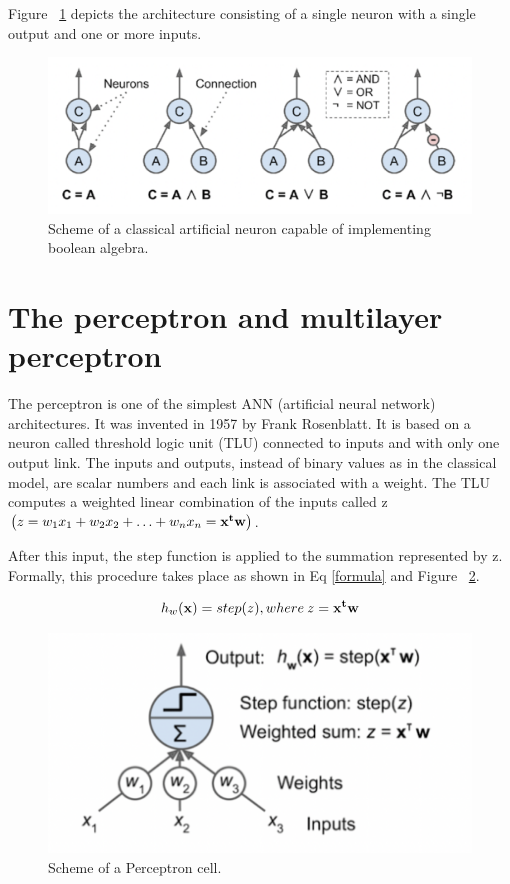 Figure ~\ref{fig:neuronsBasic} depicts the architecture consisting of a single neuron with a single output and one or more inputs.
\begin{figure} [h]
    \centering
    \includegraphics [width=\textwidth,height=\textheight,keepaspectratio] {Assets/Theory_and_methods/unnamed.png}
    \caption{ Scheme of a classical artificial neuron capable of implementing boolean algebra.}
    \label{fig:neuronsBasic}
\end{figure}

\clearpage

\section{The perceptron and multilayer perceptron} \label{percy}
The perceptron is one of the simplest ANN (artificial neural network) architectures. It was invented in 1957 by Frank Rosenblatt. It is based on a neuron called threshold logic unit (TLU) connected to inputs and with only one output link. The inputs and outputs, instead of binary values as in the classical model, are scalar numbers and each link is associated with a weight. The TLU computes a weighted linear combination of the inputs called z $\left(z=w_{1} x_{1}+w_{2} x_{2}+\ldots+w_{n} x_{n}= {\bf x^{t} w}\right)$.

After this input, the step function is applied to the summation represented by z. Formally, this procedure takes place as shown in Eq \eqref{formula} and Figure ~\ref{fig:summatory}.

\begin{equation} 
    h_{w}({\bf x}) = step(z), where \:z = {\bf x^{t} w}
    \label{formula}
\end{equation} 

\begin{figure} [h]
    \centering
   \includegraphics[width=\textwidth,height=\textheight,keepaspectratio]{Assets/Theory_and_methods/unnamed-2.png}
    \caption{Scheme of a Perceptron cell.}
    \label{fig:summatory}
\end{figure}


